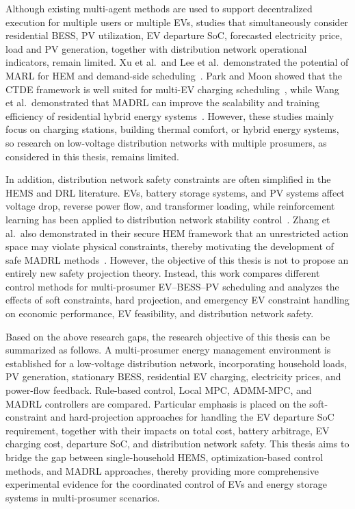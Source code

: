 Although existing multi-agent methods are used to support decentralized execution for multiple users or multiple EVs, studies that simultaneously consider residential BESS, PV utilization, EV departure SoC, forecasted electricity price, load and PV generation, together with distribution network operational indicators, remain limited. Xu et al.\ and Lee et al.\ demonstrated the potential of MARL for HEM and demand-side scheduling~\parencite{8981876,9302935}. Park and Moon showed that the CTDE framework is well suited for multi-EV charging scheduling~\parencite{PARK2022120111}, while Wang et al.\ demonstrated that MADRL can improve the scalability and training efficiency of residential hybrid energy systems~\parencite{WANG2024123414}. However, these studies mainly focus on charging stations, building thermal comfort, or hybrid energy systems, so research on low-voltage distribution networks with multiple prosumers, as considered in this thesis, remains limited.

In addition, distribution network safety constraints are often simplified in the HEMS and DRL literature. EVs, battery storage systems, and PV systems affect voltage drop, reverse power flow, and transformer loading, while reinforcement learning has been applied to distribution network stability control~\parencite{9960416}. Zhang et al.\ also demonstrated in their secure HEM framework that an unrestricted action space may violate physical constraints, thereby motivating the development of safe MADRL methods~\parencite{ZHANG2024124155}. However, the objective of this thesis is not to propose an entirely new safety projection theory. Instead, this work compares different control methods for multi-prosumer EV--BESS--PV scheduling and analyzes the effects of soft constraints, hard projection, and emergency EV constraint handling on economic performance, EV feasibility, and distribution network safety.

Based on the above research gaps, the research objective of this thesis can be summarized as follows. A multi-prosumer energy management environment is established for a low-voltage distribution network, incorporating household loads, PV generation, stationary BESS, residential EV charging, electricity prices, and power-flow feedback. Rule-based control, Local MPC, ADMM-MPC, and MADRL controllers are compared. Particular emphasis is placed on the soft-constraint and hard-projection approaches for handling the EV departure SoC requirement, together with their impacts on total cost, battery arbitrage, EV charging cost, departure SoC, and distribution network safety. This thesis aims to bridge the gap between single-household HEMS, optimization-based control methods, and MADRL approaches, thereby providing more comprehensive experimental evidence for the coordinated control of EVs and energy storage systems in multi-prosumer scenarios.

